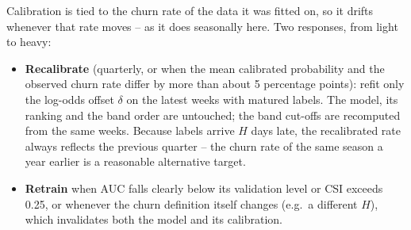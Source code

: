 Calibration is tied to the churn rate of the data it was fitted on, so it drifts whenever that rate moves -- as it does seasonally here. Two responses, from light to heavy:

\begin{itemize}
    \item \textbf{Recalibrate} (quarterly, or when the mean calibrated probability and the observed churn rate differ by more than about 5 percentage points): refit only the log-odds offset $\delta$ on the latest weeks with matured labels. The model, its ranking and the band order are untouched; the band cut-offs are recomputed from the same weeks. Because labels arrive $H$ days late, the recalibrated rate always reflects the previous quarter -- the churn rate of the same season a year earlier is a reasonable alternative target.
    \item \textbf{Retrain} when AUC falls clearly below its validation level or CSI exceeds 0.25, or whenever the churn definition itself changes (e.g.\ a different $H$), which invalidates both the model and its calibration.
\end{itemize}
